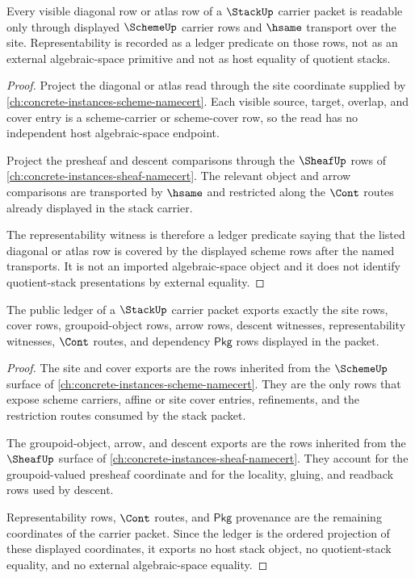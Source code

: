 \begin{theorem}\label{thm:stack-representability-obligation}
Every visible diagonal row or atlas row of a $\StackUp$ carrier packet is readable only through displayed $\SchemeUp$ carrier rows and $\hsame$ transport over the site. Representability is recorded as a ledger predicate on those rows, not as an external algebraic-space primitive and not as host equality of quotient stacks.
\end{theorem}
\begin{proof}
Project the diagonal or atlas read through the site coordinate supplied by \autoref{ch:concrete-instances-scheme-namecert}. Each visible source, target, overlap, and cover entry is a scheme-carrier or scheme-cover row, so the read has no independent host algebraic-space endpoint.

Project the presheaf and descent comparisons through the $\SheafUp$ rows of \autoref{ch:concrete-instances-sheaf-namecert}. The relevant object and arrow comparisons are transported by $\hsame$ and restricted along the $\Cont$ routes already displayed in the stack carrier.

The representability witness is therefore a ledger predicate saying that the listed diagonal or atlas row is covered by the displayed scheme rows after the named transports. It is not an imported algebraic-space object and it does not identify quotient-stack presentations by external equality.
\end{proof}

\begin{theorem}\label{thm:stack-ledger-obligation}
The public ledger of a $\StackUp$ carrier packet exports exactly the site rows, cover rows, groupoid-object rows, arrow rows, descent witnesses, representability witnesses, $\Cont$ routes, and dependency $\mathsf{Pkg}$ rows displayed in the packet.
\end{theorem}
\begin{proof}
The site and cover exports are the rows inherited from the $\SchemeUp$ surface of \autoref{ch:concrete-instances-scheme-namecert}. They are the only rows that expose scheme carriers, affine or site cover entries, refinements, and the restriction routes consumed by the stack packet.

The groupoid-object, arrow, and descent exports are the rows inherited from the $\SheafUp$ surface of \autoref{ch:concrete-instances-sheaf-namecert}. They account for the groupoid-valued presheaf coordinate and for the locality, gluing, and readback rows used by descent.

Representability rows, $\Cont$ routes, and $\mathsf{Pkg}$ provenance are the remaining coordinates of the carrier packet. Since the ledger is the ordered projection of these displayed coordinates, it exports no host stack object, no quotient-stack equality, and no external algebraic-space equality.
\end{proof}

